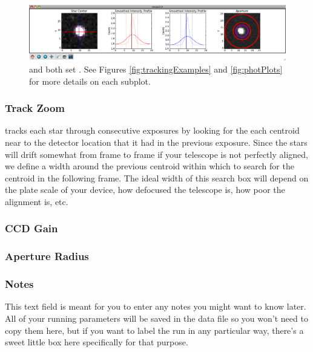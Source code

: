 \documentclass[a4paper]{article}
\begin{document}
\begin{figure}[h]
\begin{center}
\includegraphics[scale=0.25]{imgs/trackAperPlots.png}
\caption{ and  both set . See Figures \ref{fig:trackingExamples} and \ref{fig:photPlots} for more details on each subplot.}
\label{fig:trackAndPhotPlots}
\end{center}	
\end{figure}



\subsubsection{Track Zoom}
\oscaar tracks each star through consecutive exposures by looking for the each centroid near to the detector location that it had in the previous exposure. Since the stars will drift somewhat from frame to frame if your telescope is not perfectly aligned, we define a width around the previous centroid within which to search for the centroid in the following frame. The ideal width of this search box will depend on the plate scale of your device, how defocused the telescope is, how poor the alignment is, etc. 



\subsubsection{CCD Gain}


\subsubsection{Aperture Radius} \label{sec:aperRad}


\subsubsection{Notes}
This text field is meant for you to enter any notes you might want to know later. All of your running parameters will be saved in the data file so you won't need to copy them here, but if you want to label the run in any particular way, there's a sweet little box here specifically for that purpose.
\end{document}
